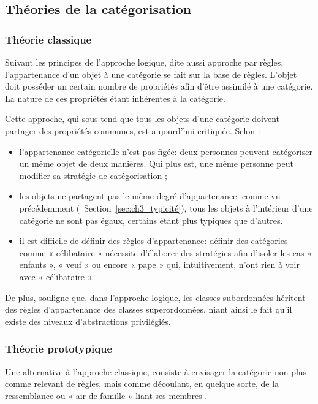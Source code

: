 \subsection{Théories de la catégorisation}
\label{sec:ch3_categoTheo}

\subsubsection{Théorie classique}

Suivant les principes de l'approche logique, dite aussi approche par règles, l'appartenance d'un objet à une catégorie se fait sur la base de règles. L'objet doit posséder un certain nombre de propriétés afin d'être assimilé à une catégorie. La nature de ces propriétés étant inhérentes à la catégorie.

Cette approche, qui sous-tend que tous les objets d'une catégorie doivent partager des propriétés communes, est aujourd'hui critiquée. Selon \citep{goldstone2003concepts}:

\begin{itemize}
\item l'appartenance catégorielle n'est pas figée: deux personnes peuvent catégoriser un même objet de deux manières. Qui plus est, une même personne peut modifier sa stratégie de catégorisation \citep{mccloskey1978natural};
\item les objets ne partagent pas le même degré d'appartenance: comme vu précédemment (\cf~Section~\ref{sec:ch3_typicité}), tous les objets à l'intérieur d'une catégorie ne sont pas égaux, certains étant plus typiques que d'autres.
\item il est difficile de définir des règles d'appartenance: définir des catégories comme « célibataire » nécessite d'élaborer des stratégies afin d'isoler les cas « enfants », « veuf » ou encore « pape » qui, intuitivement, n'ont rien à voir avec « célibataire ». 
\end{itemize}

De plus, \citep[49]{Houix03f} souligne que, dans l'approche logique, les classes subordonnées héritent des règles d'appartenance des classes superordonnées, niant ainsi le fait qu'il existe des niveaux d'abstractions privilégiés. 

\subsubsection{Théorie prototypique}

Une alternative à l'approche classique, consiste à envisager la catégorie non plus comme relevant de règles, mais comme découlant, en quelque sorte, de la ressemblance ou « air de famille » liant ses membres \citep{ludwig1953philosophical}.

